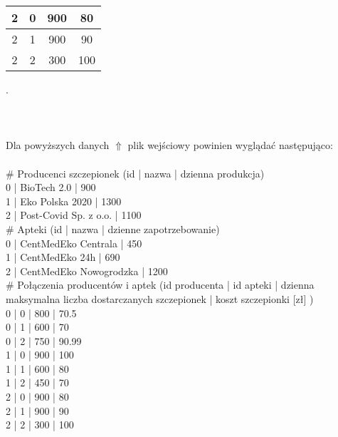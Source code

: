 \documentclass[]{article}
\begin{document}
\begin{table}[h!]
{\begin{tabular}{|c|c|c|c|}
2                      & 0                                          & 900                                                          & 80                                  \\ \hline
2                      & 1                                          & 900                                                          & 90                                  \\ \hline
2                      & 2                                          & 300                                                          & 100                                 \\ \hline
\end{tabular}
}
\end{table}
.\\\\\\\\
 Dla powyższych danych $\Uparrow  $  plik wejściowy powinien wyglądać następująco:\\\\
\# Producenci szczepionek (id | nazwa | dzienna produkcja)\\
0 | BioTech 2.0 | 900\\
1 | Eko Polska 2020 | 1300\\
2 | Post-Covid Sp. z o.o. | 1100\\
\# Apteki (id | nazwa | dzienne zapotrzebowanie)\\
0 | CentMedEko Centrala | 450\\
1 | CentMedEko 24h | 690\\
2 | CentMedEko Nowogrodzka | 1200\\
\# Połączenia producentów i aptek (id producenta | id apteki | dzienna maksymalna liczba dostarczanych szczepionek | koszt szczepionki [zł] )\\
0 | 0 | 800 | 70.5\\
0 | 1 | 600 | 70\\
0 | 2 | 750 | 90.99\\
1 | 0 | 900 | 100\\
1 | 1 | 600 | 80\\
1 | 2 | 450 | 70\\
2 | 0 | 900 | 80\\
2 | 1 | 900 | 90\\
2 | 2 | 300 | 100\\




\clearpage
\end{document}
